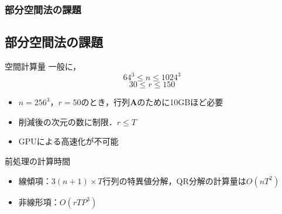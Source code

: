 \documentclass[aspectratio=169,dvipdfmx,hyperref={bookmarks=true}]{beamer}
\begin{document}

\begin{frame}
\frametitle{部分空間法の課題}
\subsection{部分空間法の課題}
	\begin{block}{空間計算量}
		一般に，
		\[64^3 \le n \le 1024^3\]
		\[30 \le r \le 150\]
   		\begin{itemize}
			\item $n = 256^3$，$r=50$のとき，行列$\bm{A}$のために10GBほど必要
   			\item 削減後の次元の数に制限．$r \le T$
   			\item GPUによる高速化が不可能
		\end{itemize}
	\end{block}

	\begin{block}{前処理の計算時間}
 		\begin{itemize}
		\item 線傾項：$3(n +1)\times T$行列の特異値分解，QR分解の計算量は$O(nT^2)$
		\item 非線形項：$O(rTP^3)$
	\end{itemize}
	\end{block}
\end{frame}
\end{document}
